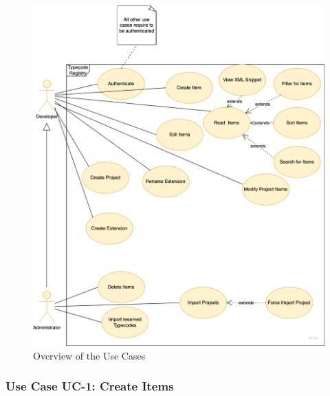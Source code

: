 \begin{figure}[H]
\hspace*{-0.5cm}\includegraphics[scale=0.43]{images/introduction/use_cases}
\caption{Overview of the Use Cases}
\label{fig:use-cases}
\end{figure}


\subsubsection{Use Case UC-1: Create Items}\label{subsubsec:use-case-uc-1:-create-items}

